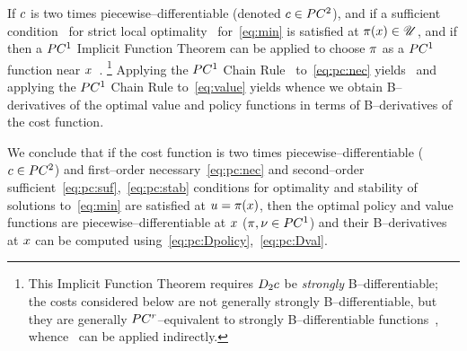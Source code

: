\documentclass{article}
\begin{document}
If 
$c$ is two times piecewise--differentiable (denoted $c\in PC^2$), 
and if a sufficient condition~\cite[Thm.~1]{Chaney1988-zq} for strict local optimality%
%
~for~\eqref{eq:min} is satisfied at $\pi(x)\in\mathscr{U}$,
and if%
then a $PC^1$ Implicit Function Theorem can be applied to choose $\pi$ as a $PC^1$ function near $x$~\citep[Cor.~3.4]{Robinson1991-xg}.%
\footnote{This Implicit Function Theorem requires $D_2c$ be \emph{strongly} B--differentiable; the costs considered below are not generally strongly B--differentiable, but they are generally $PC^r$--equivalent to strongly B--differentiable functions~\cite[Thm.~3.1]{Kuntz1994-qf}, whence~\cite[Cor.~3.4]{Robinson1991-xg} can be applied indirectly.} Applying the $PC^1$ Chain Rule~\citep[Thm.~3.1.1]{Scholtes2012-la} to~\eqref{eq:pc:nec} yields~
and applying the $PC^1$ Chain Rule to~\eqref{eq:value} yields
whence we obtain B--derivatives of the optimal value and policy functions in terms of B--derivatives of the cost function.

We conclude that if the cost function is two times piecewise--differentiable ($c\in PC^2$) and first--order necessary~\eqref{eq:pc:nec} and second--order sufficient~\eqref{eq:pc:suf},~\eqref{eq:pc:stab} conditions for optimality and stability of solutions to~\eqref{eq:min} are satisfied at $u = \pi(x)$, then the optimal policy and value functions are piecewise--differentiable at $x$ ($\pi,\nu\in PC^1$) and their B--derivatives at $x$ can be computed using~\eqref{eq:pc:Dpolicy},~\eqref{eq:pc:Dval}.
\end{document}
